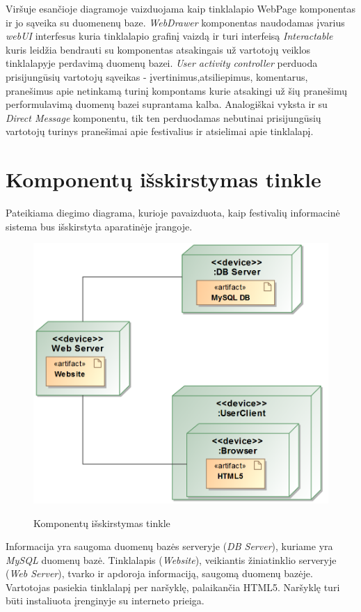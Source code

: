 ﻿\documentclass{VUMIFPSkursinis}
\begin{document}
Viršuje esančioje diagramoje vaizduojama kaip tinklalapio WebPage komponentas ir jo sąveika su duomenenų baze.
\textit{WebDrawer} komponentas naudodamas įvarius \textit{webUI} interfesus kuria tinklalapio grafinį vaizdą ir turi interfeisą \textit{Interactable} kuris
leidžia bendrauti su komponentas atsakingais už vartotojų veiklos tinklalapyje perdavimą duomenų bazei. \textit{User activity controller} 
perduoda prisijungūsių vartotojų sąveikas - įvertinimus,atsiliepimus, komentarus, pranešimus apie netinkamą turinį kompontams kurie 
atsakingi už šių pranešimų performulavimą duomenų bazei suprantama kalba. Analogiškai vyksta ir su \textit{Direct Message} komponentu, tik ten perduodamas nebutinai prisijungūsių vartotojų turinys pranešimai apie festivalius ir atsielimai apie tinklalapį. 
\section{Komponentų išskirstymas tinkle}
Pateikiama diegimo diagrama, kurioje pavaizduota, kaip festivalių informacinė sistema bus išskirstyta aparatinėje įrangoje. 
\begin{figure}[H]
\centering
    \includegraphics[scale=0.5]{img/PSI3/deploy.PNG}
	\label{uml:22}
	\caption{Komponentų išskirstymas tinkle}
\end{figure}
Informacija yra saugoma duomenų bazės serveryje (\textit{DB Server}), kuriame yra \textit{MySQL} duomenų bazė. Tinklalapis (\textit{Website}), veikiantis žiniatinklio serveryje (\textit{Web Server}), tvarko ir apdoroja informaciją, saugomą duomenų bazėje. Vartotojas pasiekia tinklalapį per naršyklę, palaikančia HTML5. Naršyklę turi būti instaliuota įrenginyje su interneto prieiga.
\end{document}
